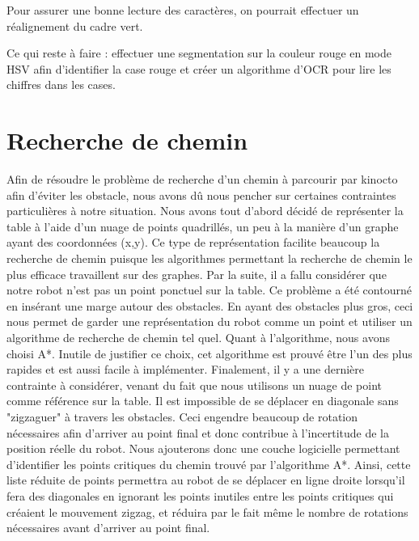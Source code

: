 Pour assurer une bonne lecture des caractères, on pourrait effectuer un réalignement du cadre vert.

Ce qui reste à faire : effectuer une segmentation sur la couleur rouge en mode HSV afin d'identifier la case rouge et créer un algorithme d'OCR pour lire les chiffres dans les cases.

\section{Recherche de chemin}
Afin de résoudre le problème de recherche d'un chemin à parcourir par kinocto afin d'éviter les obstacle, nous avons dû nous pencher sur certaines contraintes particulières à notre situation. Nous avons tout d'abord décidé de représenter la table à l'aide d'un nuage de points quadrillés, un peu à la manière d'un graphe ayant des coordonnées (x,y). Ce type de représentation facilite beaucoup la recherche de chemin puisque les algorithmes permettant la recherche de chemin le plus efficace travaillent sur des graphes.  Par la suite, il a fallu considérer que notre robot n'est pas un point ponctuel sur la table. Ce problème a été contourné en insérant une marge autour des obstacles. En ayant des obstacles plus gros, ceci nous permet de garder une représentation du robot comme un point et utiliser un algorithme de recherche de chemin tel quel. Quant à l'algorithme, nous avons choisi A*. Inutile de justifier ce choix, cet algorithme est prouvé être l'un des plus rapides et est aussi facile à implémenter. Finalement, il y a une dernière contrainte à considérer, venant du fait que nous utilisons un nuage de point comme référence sur la table. Il est impossible de se déplacer en diagonale sans "zigzaguer" à travers les obstacles. Ceci engendre beaucoup de rotation nécessaires afin d'arriver au point final et donc contribue à l'incertitude de la position réelle du robot. Nous ajouterons donc une couche logicielle permettant d'identifier les points critiques du chemin trouvé par l'algorithme A*. Ainsi, cette liste réduite de points permettra au robot de se déplacer en ligne droite lorsqu'il fera des diagonales en ignorant les points inutiles entre les points critiques qui créaient le mouvement zigzag, et réduira par le fait même le nombre de rotations nécessaires avant d'arriver au point final. 

